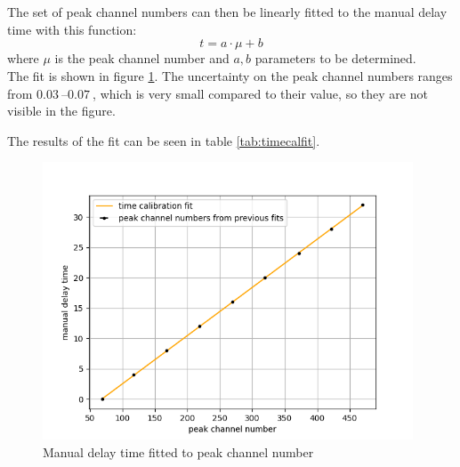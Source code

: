 \\
\\The set of peak channel numbers can then be linearly fitted to the manual delay time with this function: 
$$ t = a\cdot\mu +b$$
where $\mu$ is the peak channel number and $a,b$ parameters to be determined. \\The fit is shown in figure \ref{fig:timecalfit}. The uncertainty on the peak channel numbers ranges from $\SIrange{0.03}{0.07}{}$, which is very small compared to their value, so they are not visible in the figure.

The results of the fit can be seen in table \ref{tab:timecalfit}.

\begin{figure}[]
    \centering
    \includegraphics[width=110mm,scale=0.5]{Positronium/include/timecalfit.png}
    \caption{Manual delay time fitted to peak channel number} 
    \label{fig:timecalfit}
\end{figure}

